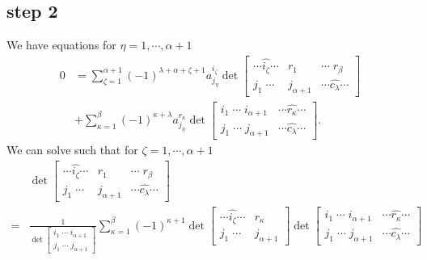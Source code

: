 \documentclass{amsart}
\begin{document}
{    \subsection{step 2}
    {
        We have equations for $\eta=1,\cdots,\alpha+1$ 
        \begin{align}
            0&=\sum_{\zeta=1}^{\alpha+1}(-1)^{\lambda+\alpha+\zeta+1}a^{i_\zeta}_{j_\eta}\det\begin{bmatrix}
                \cdots\widehat{i_\zeta}\cdots&r_1&\cdots\;r_\beta\\
                j_1\;\cdots&j_{\alpha+1}&\cdots\widehat{c_\lambda}\cdots
            \end{bmatrix}\\
            &+\sum_{\kappa=1}^\beta(-1)^{\kappa+\lambda}a^{r_\kappa}_{j_\eta}\det\begin{bmatrix}
                i_1\;\cdots\;i_{\alpha+1}&\cdots\widehat{r_\kappa}\cdots\\
                j_1\;\cdots\;j_{\alpha+1}&\cdots\widehat{c_\lambda}\cdots
            \end{bmatrix}. 
        \end{align}
        We can solve such that for $\zeta=1,\cdots,\alpha+1$ 
        \begin{align}
            &\det\begin{bmatrix}
                \cdots\widehat{i_\zeta}\cdots&r_1&\cdots\;r_\beta\\
                j_1\;\cdots&j_{\alpha+1}&\cdots\widehat{c_\lambda}\cdots
            \end{bmatrix}\\
            ={}&\frac{1}{\det\begin{bmatrix}
                i_1\;\cdots\;i_{\alpha+1}\\
                j_1\;\cdots\;j_{\alpha+1}
            \end{bmatrix}}\sum_{\kappa=1}^\beta(-1)^{\kappa+1}\det\begin{bmatrix}
                \cdots\widehat{i_\zeta}\cdots&r_\kappa\\
                j_1\;\cdots&j_{\alpha+1}
            \end{bmatrix}\det\begin{bmatrix}
                i_1\;\cdots\;i_{\alpha+1}&\cdots\widehat{r_\kappa}\cdots\\
                j_1\;\cdots\;j_{\alpha+1}&\cdots\widehat{c_\lambda}\cdots
            \end{bmatrix}
        \end{align}
    }

}
\end{document}
